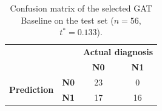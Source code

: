 \documentclass[10pt,a4paper,twocolumn,twoside]{article}
\begin{document}
\begin{table}[H]
\centering
\caption{Confusion matrix of the selected GAT Baseline on the test set ($n\!=\!56$, $t^*\!=\!0.133$).}
\label{tab:cm}
\small
\begin{tabular}{llcc}
\toprule
 & & \multicolumn{2}{c}{\textbf{Actual diagnosis}} \\
 & & \textbf{N0} & \textbf{N1} \\
\midrule
\multirow{2}{*}{\textbf{Prediction}}
  & \textbf{N0} & 23 & 0 \\
  & \textbf{N1} & 17 & 16 \\
\bottomrule
\end{tabular}
\end{table}
\end{document}
